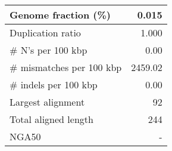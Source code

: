 \documentclass[12pt,a4paper]{article}
\begin{document}
\begin{table}[ht]
\begin{center}
\begin{tabular}{|l*{1}{|r}|}
Genome fraction (\%) & 0.015 \\ \hline
Duplication ratio & 1.000 \\ \hline
\# N's per 100 kbp & 0.00 \\ \hline
\# mismatches per 100 kbp & 2459.02 \\ \hline
\# indels per 100 kbp & 0.00 \\ \hline
Largest alignment & 92 \\ \hline
Total aligned length & 244 \\ \hline
NGA50 & - \\ \hline
\end{tabular}
\end{center}
\end{table}
\end{document}
